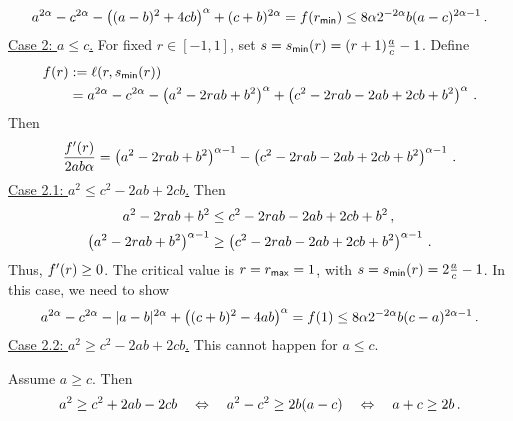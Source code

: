 \begin{equation*}
	a^{2\alpha}-c^{2\alpha}-\left( (a-b)^2+4cb \right)^{\alpha}+(c+b)^{2\alpha} = f(r_{\mathsf{min}}) \leq 8\alpha 2^{-2\alpha} b (a-c)^{2\alpha-1}
	\, .
\end{equation*}
\underline{Case 2: $a\leq c$.}  For fixed $r\in[-1,1]$, set $s = s_{\mathsf{min}}(r) = (r+1) \frac ac-1$. Define
\begin{align*}
	f(r) &:= \ell(r,s_{\mathsf{min}}(r)) 
	\\&= a^{2\alpha}-c^{2\alpha}-\left( a^2-2rab+b^2 \right)^\alpha+\left( c^2-2rab-2ab+2cb+b^2 \right)^\alpha
	\, .
\end{align*}
Then 
\begin{equation*}
	\frac{f^\prime(r)}{2ab\alpha} = 
	\left( a^2-2rab+b^2 \right)^{\alpha-1} - \left( c^2-2rab-2ab+2cb+b^2 \right)^{\alpha-1}
	\, .
\end{equation*}
\underline{Case 2.1: $a^2 \leq c^2-2ab+2cb$.} Then
\begin{align*}
	a^2-2rab+b^2 &\leq c^2-2rab-2ab+2cb+b^2\, ,\\
	\left( a^2-2rab+b^2 \right)^{\alpha-1} &\geq \left( c^2-2rab-2ab+2cb+b^2 \right)^{\alpha-1}\, .
\end{align*}
Thus, $f^\prime(r)\geq0$. The critical value is $r = r_{\mathsf{max}} = 1$, with $s = s_{\mathsf{min}}(r) = 2\frac ac-1$. In this case, we need to show
\begin{equation*}
	a^{2\alpha}-c^{2\alpha}-|a-b|^{2\alpha}+\left( (c+b)^2-4ab \right)^{\alpha} = f(1) \leq 8\alpha 2^{-2\alpha} b (c-a)^{2\alpha-1}
	\, .
\end{equation*}
\underline{Case 2.2: $a^2 \geq c^2-2ab+2cb$.} This cannot happen for $a\leq c$.
%
\begin{remark}
Assume $a\geq c$. Then
\begin{align*}
	a^2 \geq c^2+2ab-2cb
	\quad\Leftrightarrow\quad
	a^2-c^2 \geq 2b(a-c)
	\quad\Leftrightarrow\quad
	a+c \geq 2b
	\, .
\end{align*}
\end{remark}
%
%
